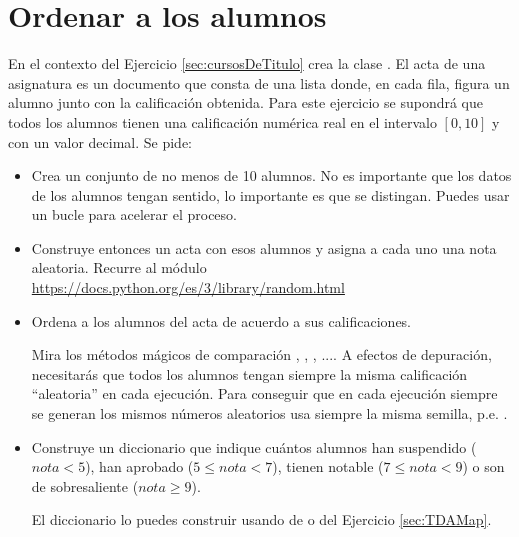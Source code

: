 %



\separacion
\section{Ordenar a los alumnos} 

En el contexto del Ejercicio \ref{sec:cursosDeTitulo} crea la clase . El acta de una asignatura es un documento que consta de una lista donde, en cada fila, figura un alumno junto con la calificación obtenida. Para este ejercicio se supondrá que todos los alumnos tienen una calificación numérica real en el intervalo $[0,10]$ y con un valor decimal. Se pide:

\begin{itemize}
\item 
Crea un conjunto de no menos de 10 alumnos. 
No es importante que los datos de los alumnos tengan sentido, lo importante es que se distingan. Puedes usar un bucle  para acelerar el proceso.

\item
Construye entonces un acta con esos alumnos y asigna a cada uno una nota aleatoria.
Recurre al módulo \url{https://docs.python.org/es/3/library/random.html}

\item Ordena a los alumnos del acta de acuerdo a sus calificaciones. 

Mira los métodos mágicos de comparación , , , ....
A efectos de depuración, necesitarás que todos los alumnos tengan siempre la misma calificación ``aleatoria''  en cada ejecución. Para conseguir que en cada ejecución siempre se generan los mismos números aleatorios usa siempre la misma semilla, p.e. .

\item Construye un diccionario que indique cuántos alumnos han suspendido ($nota < 5$), han aprobado ($5\leq nota < 7$), tienen notable ($7\leq nota < 9$) o son de sobresaliente ($nota \geq 9$).

El diccionario lo puedes construir usando  de  o  del Ejercicio \ref{sec:TDAMap}.
\end{itemize}



%


\separacion


